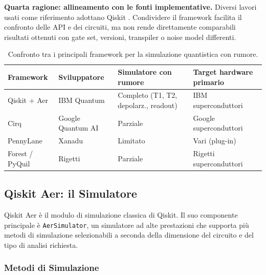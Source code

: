\begin{onehalfspace}
\textbf{Quarta ragione: allineamento con le fonti implementative.} Diversi lavori usati come riferimento adottano Qiskit \cite{skosana2021, shor_hpec2023, ml_mitigation2023}. Condividere il framework facilita il confronto delle API e dei circuiti, ma non rende direttamente comparabili risultati ottenuti con gate set, versioni, transpiler o noise model differenti.

\begin{table}[H]
\centering

\small
\begin{tabularx}{\textwidth}{@{}>{\raggedright\arraybackslash}p{2.5cm}XXX@{}}
\toprule
\textbf{Framework} & \textbf{Sviluppatore} & \textbf{Simulatore con rumore} & \textbf{Target hardware primario} \\
\midrule
Qiskit + Aer        & IBM Quantum           & Completo (T1, T2, depolarz., readout) & IBM superconduttori \\
\addlinespace[0.3em]
Cirq                & Google Quantum AI     & Parziale                               & Google superconduttori \\
\addlinespace[0.3em]
PennyLane           & Xanadu                & Limitato                               & Vari (plug-in) \\
\addlinespace[0.3em]
Forest / PyQuil     & Rigetti               & Parziale                               & Rigetti superconduttori \\
\bottomrule
\end{tabularx}
\caption{Confronto tra i principali framework per la simulazione quantistica con rumore.}\label{tab:framework_confronto}

\end{table}

\subsection{Qiskit Aer: il Simulatore}
\label{sec:qiskit_aer}

Qiskit Aer è il modulo di simulazione classica di Qiskit. Il suo componente principale è \texttt{AerSimulator}, un simulatore ad alte prestazioni che supporta più metodi di simulazione selezionabili a seconda della dimensione del circuito e del tipo di analisi richiesta.

\subsubsection{Metodi di Simulazione}


\end{onehalfspace}
